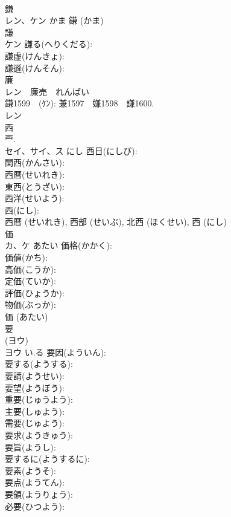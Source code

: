 \documentclass[8pt]{extreport}
\begin{document}
\begin{CJK}{UTF8}{min}
\\	鎌			
\\	レン、ケン	かま		鎌 (かま)
\\	謙			
\\	ケン		謙る(へりくだる): 
\\	謙虚(けんきょ): 
\\	謙遜(けんそん): 
\\	廉			
\\	レン　廉売　れんばい
\\	鎌1599　(ｹﾝ): 兼1597　嫌1598　謙1600.	
\\	レン			
\\	西			
\\	⻃. 
\\	セイ、サイ、ス	にし	西日(にしび): 
\\	関西(かんさい): 
\\	西暦(せいれき): 
\\	東西(とうざい): 
\\	西洋(せいよう): 
\\	西(にし): 
\\	西暦 (せいれき), 西部 (せいぶ), 北西 (ほくせい), 西 (にし)
\\	価			
\\	カ、ケ	あたい	価格(かかく): 
\\	価値(かち): 
\\	高価(こうか): 
\\	定価(ていか): 
\\	評価(ひょうか): 
\\	物価(ぶっか): 
\\	価 (あたい)
\\	要			
\\	(ヨウ) 
\\	ヨウ	い.る	要因(よういん): 
\\	要する(ようする): 
\\	要請(ようせい): 
\\	要望(ようぼう): 
\\	重要(じゅうよう): 
\\	主要(しゅよう): 
\\	需要(じゅよう): 
\\	要求(ようきゅう): 
\\	要旨(ようし): 
\\	要するに(ようするに): 
\\	要素(ようそ): 
\\	要点(ようてん): 
\\	要領(ようりょう): 
\\	必要(ひつよう): 

\end{CJK}
\end{document}
